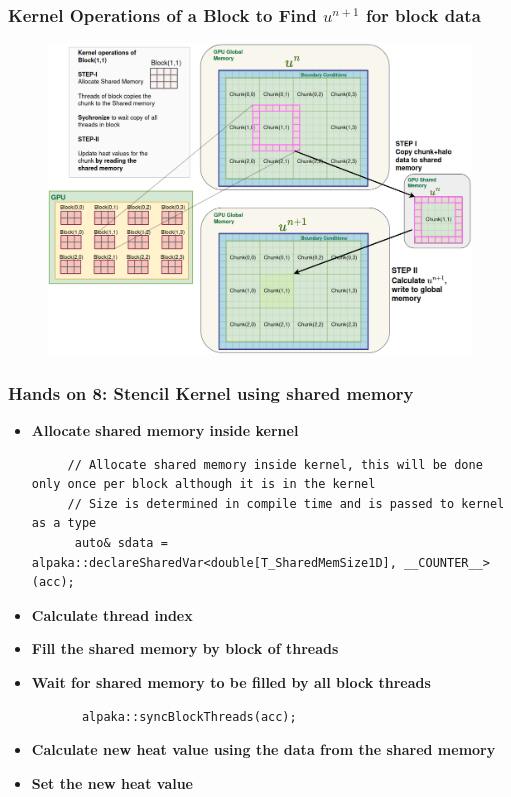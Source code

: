 \documentclass[9pt]{beamer}
\begin{document}
\begin{frame}
\frametitle{Kernel Operations of a Block to Find $u^{n+1}$ for block data}
\begin{figure}
    \centering
    \includegraphics[width=0.9\linewidth]{Screenshot from 2024-10-01 12-57-11.png}
    \label{fig:enter-label}
\end{figure}
\end{frame}

\begin{frame}[fragile]
\frametitle{Hands on 8: Stencil Kernel using shared memory}
\begin{itemize}
    \item \textbf{Allocate shared memory inside kernel}
   \lstset{basicstyle=\ttfamily\scriptsize}
     \begin{lstlisting}
     // Allocate shared memory inside kernel, this will be done only once per block although it is in the kernel
     // Size is determined in compile time and is passed to kernel as a type
      auto& sdata = alpaka::declareSharedVar<double[T_SharedMemSize1D], __COUNTER__>(acc);
        \end{lstlisting}
 \item \textbf{Calculate thread index}
  \item \textbf{Fill the shared memory by block of threads}
 \item \textbf{Wait for shared memory to be filled by all block threads}
 \begin{lstlisting}
       alpaka::syncBlockThreads(acc);
   \end{lstlisting}
 \item \textbf{Calculate new heat value using the data from the shared memory}
 \item \textbf{Set the new heat value}
 \end{itemize}
\end{frame}
\end{document}
